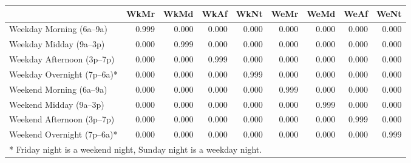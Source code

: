 \begin{footnotesize}
\begin{tabular}{p{2.3cm} | r r r r r r r r}
& WkMr & WkMd & WkAf & WkNt & WeMr & WeMd & WeAf & WeNt \\
\hline
Weekday Morning (6a--9a)   & 0.999 & 0.000 & 0.000 & 0.000 & 0.000 & 0.000 & 0.000 & 0.000 \\
Weekday Midday (9a--3p)    & 0.000 & 0.999 & 0.000 & 0.000 & 0.000 & 0.000 & 0.000 & 0.000 \\
Weekday Afternoon (3p--7p) & 0.000 & 0.000 & 0.999 & 0.000 & 0.000 & 0.000 & 0.000 & 0.000 \\
Weekday Overnight (7p--6a)*& 0.000 & 0.000 & 0.000 & 0.999 & 0.000 & 0.000 & 0.000 & 0.000 \\
Weekend Morning (6a--9a)   & 0.000 & 0.000 & 0.000 & 0.000 & 0.999 & 0.000 & 0.000 & 0.000 \\
Weekend Midday (9a--3p)    & 0.000 & 0.000 & 0.000 & 0.000 & 0.000 & 0.999 & 0.000 & 0.000 \\
Weekend Afternoon (3p--7p) & 0.000 & 0.000 & 0.000 & 0.000 & 0.000 & 0.000 & 0.999 & 0.000 \\
Weekend Overnight (7p--6a)*& 0.000 & 0.000 & 0.000 & 0.000 & 0.000 & 0.000 & 0.000 & 0.999 \\
\hline
\multicolumn{9}{l}{* Friday night is a weekend night, Sunday night is a weekday night.}
\end{tabular}
\end{footnotesize}
  
